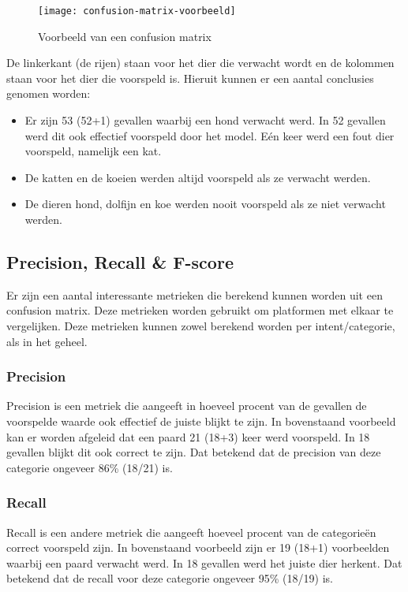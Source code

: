 \begin{figure}[H]
    \label{fig:confusion-matrix-voorbeeld}
    \centering
    \texttt{[image: confusion-matrix-voorbeeld]}
    \caption{Voorbeeld van een confusion matrix}
\end{figure}

De linkerkant (de rijen) staan voor het dier die verwacht wordt en de kolommen staan voor het dier die voorspeld is. Hieruit kunnen er een aantal conclusies genomen worden:
\begin{itemize}
    \item Er zijn 53 (52+1) gevallen waarbij een hond verwacht werd. In 52 gevallen werd dit ook effectief voorspeld door het model. Eén keer werd een fout dier voorspeld, namelijk een kat.
    \item De katten en de koeien werden altijd voorspeld als ze verwacht werden.
    \item De dieren hond, dolfijn en koe werden nooit voorspeld als ze niet verwacht werden.
\end{itemize}

\subsection{Precision, Recall \& F-score}
\label{subsec:validatie-precision-recall-f-score}

Er zijn een aantal interessante metrieken die berekend kunnen worden uit een confusion matrix. Deze metrieken worden gebruikt om platformen met elkaar te vergelijken. Deze metrieken kunnen zowel berekend worden per intent/categorie, als in het geheel.

\subsubsection{Precision}

Precision is een metriek die aangeeft in hoeveel procent van de gevallen de voorspelde waarde ook effectief de juiste blijkt te zijn.
In bovenstaand voorbeeld kan er worden afgeleid dat een paard 21 (18+3) keer werd voorspeld. In 18 gevallen blijkt dit ook correct te zijn. Dat betekend dat de precision van deze categorie ongeveer 86\% (18/21) is. 

\subsubsection{Recall}

Recall is een andere metriek die aangeeft hoeveel procent van de categorieën correct voorspeld zijn. In bovenstaand voorbeeld zijn er 19 (18+1) voorbeelden waarbij een paard verwacht werd. In 18 gevallen werd het juiste dier herkent. Dat betekend dat de recall voor deze categorie ongeveer 95\% (18/19) is.

